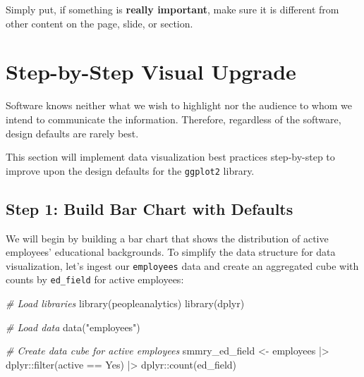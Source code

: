 \documentclass[
]{book}
\newenvironment{Shaded}{\begin{snugshade}}{\end{snugshade}}
\newcommand{\CommentTok}[1]{\textcolor[rgb]{0.56,0.35,0.01}{\textit{#1}}}
\newcommand{\FunctionTok}[1]{\textcolor[rgb]{0.00,0.00,0.00}{#1}}
\newcommand{\NormalTok}[1]{#1}
\newcommand{\OtherTok}[1]{\textcolor[rgb]{0.56,0.35,0.01}{#1}}
\newcommand{\SpecialCharTok}[1]{\textcolor[rgb]{0.00,0.00,0.00}{#1}}
\newcommand{\StringTok}[1]{\textcolor[rgb]{0.31,0.60,0.02}{#1}}
\begin{document}
Simply put, if something is \textbf{really important}, make sure it is different from other content on the page, slide, or section.

\hypertarget{step-by-step-visual-upgrade}{%
\section{Step-by-Step Visual Upgrade}\label{step-by-step-visual-upgrade}}

Software knows neither what we wish to highlight nor the audience to whom we intend to communicate the information. Therefore, regardless of the software, design defaults are rarely best.

This section will implement data visualization best practices step-by-step to improve upon the design defaults for the \texttt{ggplot2} library.

\hypertarget{step-1-build-bar-chart-with-defaults}{%
\subsection{Step 1: Build Bar Chart with Defaults}\label{step-1-build-bar-chart-with-defaults}}

We will begin by building a bar chart that shows the distribution of active employees' educational backgrounds. To simplify the data structure for data visualization, let's ingest our \texttt{employees} data and create an aggregated cube with counts by \texttt{ed\_field} for active employees:

\begin{Shaded}
\begin{Highlighting}[]
\CommentTok{\# Load libraries}
\FunctionTok{library}\NormalTok{(peopleanalytics)}
\FunctionTok{library}\NormalTok{(dplyr)}

\CommentTok{\# Load data}
\FunctionTok{data}\NormalTok{(}\StringTok{"employees"}\NormalTok{)}

\CommentTok{\# Create data cube for active employees}
\NormalTok{smmry\_ed\_field }\OtherTok{\textless{}{-}}\NormalTok{ employees }\SpecialCharTok{|\textgreater{}}
\NormalTok{                  dplyr}\SpecialCharTok{::}\FunctionTok{filter}\NormalTok{(active }\SpecialCharTok{==} \StringTok{\textquotesingle{}Yes\textquotesingle{}}\NormalTok{) }\SpecialCharTok{|\textgreater{}}
\NormalTok{                  dplyr}\SpecialCharTok{::}\FunctionTok{count}\NormalTok{(ed\_field)}
\end{Highlighting}
\end{Shaded}
\end{document}
